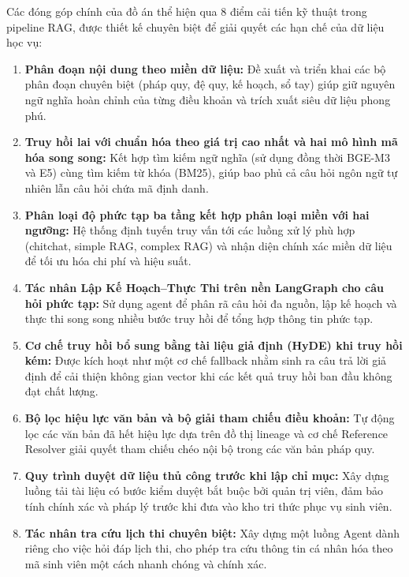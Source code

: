 \documentclass[../DoAn.tex]{subfiles}
\begin{document}
Các đóng góp chính của đồ án thể hiện qua 8 điểm cải tiến kỹ thuật trong
pipeline RAG, được thiết kế chuyên biệt để giải quyết các hạn chế của dữ liệu học vụ:

\begin{enumerate}
    \item \textbf{Phân đoạn nội dung theo miền dữ liệu:} Đề xuất và triển khai các bộ
    phân đoạn chuyên biệt (pháp quy, đệ quy, kế hoạch, sổ tay) giúp giữ nguyên ngữ
    nghĩa hoàn chỉnh của từng điều khoản và trích xuất siêu dữ liệu phong phú.
    \item \textbf{Truy hồi lai với chuẩn hóa theo giá trị cao nhất và hai mô hình mã hóa song song:} 
    Kết hợp tìm kiếm ngữ nghĩa (sử dụng đồng thời BGE-M3 và E5) cùng tìm kiếm từ khóa (BM25),
    giúp bao phủ cả câu hỏi ngôn ngữ tự nhiên lẫn câu hỏi chứa mã định danh.
    \item \textbf{Phân loại độ phức tạp ba tầng kết hợp phân loại miền với hai ngưỡng:}
    Hệ thống định tuyến truy vấn tới các luồng xử lý phù hợp (chitchat, simple RAG, complex RAG)
    và nhận diện chính xác miền dữ liệu để tối ưu hóa chi phí và hiệu suất.
    \item \textbf{Tác nhân Lập Kế Hoạch--Thực Thi trên nền LangGraph cho câu hỏi phức tạp:}
    Sử dụng agent để phân rã câu hỏi đa nguồn, lập kế hoạch và thực thi song song 
    nhiều bước truy hồi để tổng hợp thông tin phức tạp.
    \item \textbf{Cơ chế truy hồi bổ sung bằng tài liệu giả định (HyDE) khi truy hồi kém:}
    Được kích hoạt như một cơ chế fallback nhằm sinh ra câu trả lời giả định để
    cải thiện không gian vector khi các kết quả truy hồi ban đầu không đạt chất lượng.
    \item \textbf{Bộ lọc hiệu lực văn bản và bộ giải tham chiếu điều khoản:} 
    Tự động lọc các văn bản đã hết hiệu lực dựa trên đồ thị lineage và cơ chế Reference Resolver
    giải quyết tham chiếu chéo nội bộ trong các văn bản pháp quy.
    \item \textbf{Quy trình duyệt dữ liệu thủ công trước khi lập chỉ mục:}
    Xây dựng luồng tải tài liệu có bước kiểm duyệt bắt buộc bởi quản trị viên, 
    đảm bảo tính chính xác và pháp lý trước khi đưa vào kho tri thức phục vụ sinh viên.
    \item \textbf{Tác nhân tra cứu lịch thi chuyên biệt:} Xây dựng một luồng Agent
    dành riêng cho việc hỏi đáp lịch thi, cho phép tra cứu thông tin cá nhân hóa
    theo mã sinh viên một cách nhanh chóng và chính xác.
\end{enumerate}
\end{document}
